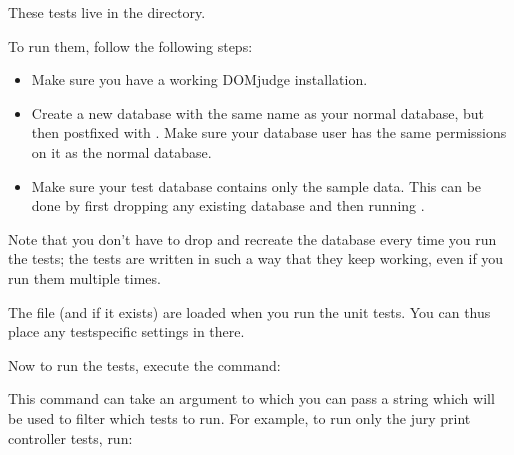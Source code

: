 \documentclass[a4paper,10pt,english,openany]{sphinxmanual}
\begin{document}
\sphinxAtStartPar
These tests live in the  directory.

\sphinxAtStartPar
To run them, follow the following steps:
\begin{itemize}
\item {} 
\sphinxAtStartPar
Make sure you have a working DOMjudge installation.

\item {} 
\sphinxAtStartPar
Create a new database with the same name as your normal database, but then
postfixed with . Make sure your database user has the same permissions
on it as the normal database.

\item {} 
\sphinxAtStartPar
Make sure your test database contains only the sample data. This can be done by
first dropping any existing database and then running
.

\end{itemize}

\sphinxAtStartPar
Note that you don’t have to drop and recreate the database every time you run the
tests; the tests are written in such a way that they keep working, even if you
run them multiple times.

\sphinxAtStartPar
The file  (and  if it
exists) are loaded when you run the unit tests. You can thus place any
test\sphinxhyphen{}specific settings in there.

\sphinxAtStartPar
Now to run the tests, execute the command:

\begin{sphinxVerbatim}[commandchars=\\\{\}]
  
\end{sphinxVerbatim}

\sphinxAtStartPar
This command can take an argument  to which you can pass a string
which will be used to filter which tests to run. For example, to run only the
jury print controller tests, run:

\begin{sphinxVerbatim}[commandchars=\\\{\}]
    \PYGZbs{}
\end{sphinxVerbatim}
\end{document}
